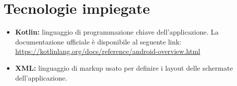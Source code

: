 \section{Tecnologie impiegate}
\begin{itemize}
	\item \textbf{Kotlin\glosp:} linguaggio di programmazione chiave dell'applicazione. La documentazione ufficiale è disponibile al seguente link:
	\newline \url{https://kotlinlang.org/docs/reference/android-overview.html}
	\item \textbf{XML\glosp:} linguaggio di markup usato per definire i layout delle schermate dell'applicazione.
\end{itemize}
